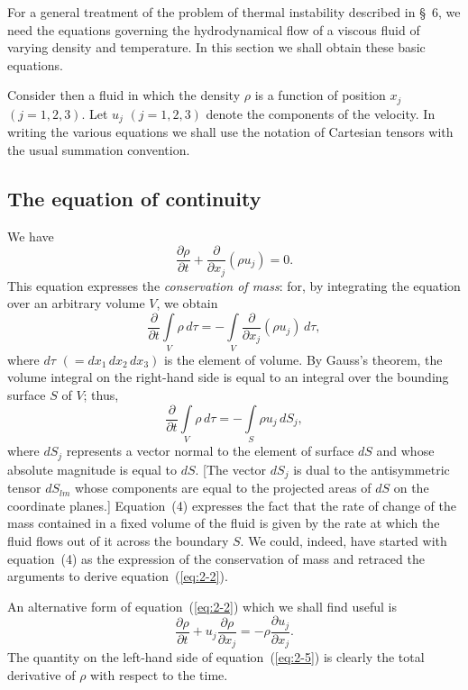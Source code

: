 For a general treatment of the problem of thermal instability described
in \S~6, we need the equations governing the hydrodynamical flow of a
viscous fluid of varying density and temperature. In this section we shall
obtain these basic equations.

Consider then a fluid in which the density $\rho$ is a function of position
$x_j$ $(j = 1, 2, 3)$. Let $u_j$ $(j = 1, 2, 3)$ denote the components of the
velocity. In writing the various equations we shall use the notation
of Cartesian tensors with the usual summation convention.

\subsection{The equation of continuity}\label{sec:7a}

We have
\begin{equation}
\label{eq:2-2}
\frac{\partial\rho}{\partial t} + \frac{\partial}{\partial x_j}(\rho u_j) = 0.
\end{equation}
This equation expresses the \emph{conservation of mass}: for, by integrating the
equation over an arbitrary volume $V$, we obtain
\begin{equation}
\label{eq:2-3}
\frac{\partial}{\partial t}\int\limits_V \rho\,d\tau = -\int\limits_V \frac{\partial}{\partial x_j}(\rho u_j)\,d\tau,
\end{equation}
where $d\tau$ $(= dx_1\,dx_2\,dx_3)$ is the element of volume. By Gauss's theorem,
the volume integral on the right-hand side is equal to an integral over
the bounding surface $S$ of $V$; thus,
\begin{equation}
\label{eq:2-4}
\frac{\partial}{\partial t}\int\limits_V \rho\,d\tau = -\int\limits_S \rho u_j\,dS_j,
\end{equation}
where $dS_j$ represents a vector normal to the element of surface $dS$ and
whose absolute magnitude is equal to $dS$. [The vector $dS_j$ is dual to
the antisymmetric tensor $dS_{lm}$ whose components are equal to the projected areas of $dS$ on the coordinate planes.] Equation~(4) expresses the
fact that the rate of change of the mass contained in a fixed volume of
the fluid is given by the rate at which the fluid flows out of it across the
boundary $S$. We could, indeed, have started with equation~(4) as the
expression of the conservation of mass and retraced the arguments to
derive equation~(\ref{eq:2-2}).

An alternative form of equation~(\ref{eq:2-2}) which we shall find useful is
\begin{equation}
\label{eq:2-5}
\frac{\partial\rho}{\partial t} + u_j\frac{\partial\rho}{\partial x_j} = -\rho\frac{\partial u_j}{\partial x_j}.
\end{equation}
The quantity on the left-hand side of equation~(\ref{eq:2-5}) is clearly the total
derivative of $\rho$ with respect to the time.

